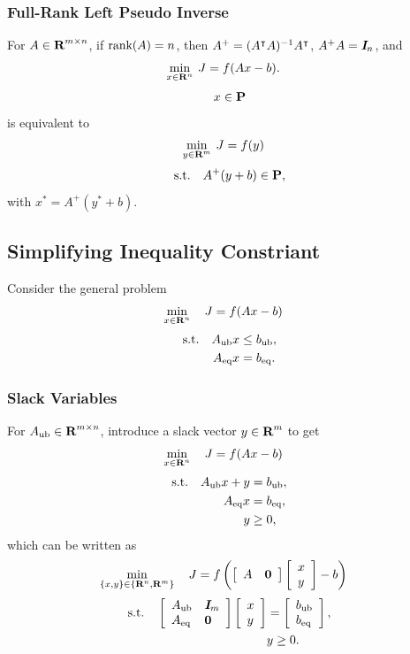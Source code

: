 \documentclass{article}
\begin{document}
\subsubsection{Full-Rank Left Pseudo Inverse}

    For $A\in\textbf{R}^{m\times n}$, if $\text{rank}(A)=n$, then
    $A^+ = (A^\intercal A)^{-1} A^\intercal$, $A^+A=\emph{\textbf{I}} _n$, and
    \begin{align*}
            \min_{x\in\textbf{R}^n}\:J
        &=
            f(A x - b).
    \end{align*}
    \begin{align*}
        x\in\textbf{P}
    \end{align*}
    is equivalent to
    \begin{align*}
        \min_{y\in\textbf{R}^m}\:J
    &= f(y)
    \end{align*}
    \begin{align*}
        \text{s.t.}\quad A^+(y+b)\in\textbf{P},
    \end{align*}
    with $x^*=A^+(y^*+b)$.

\clearpage

\subsection{Simplifying Inequality Constriant}

    Consider the general problem
    \begin{align*}
        \min_{x\in\textbf{R}^n}\quad J&=f(Ax-b)
    \end{align*}
    \begin{align*}
        \text{s.t.}\quad A_{\text{ub}} &x \leq b_{\text{ub}},\\
        A_{\text{eq}} &x = b_{\text{eq}}.
    \end{align*}

\subsubsection{Slack Variables}

    For $A_{\text{ub}}\in\textbf{R}^{m\times n}$, introduce a slack vector $y\in\textbf{R}^m$ to get
    \begin{align*}
        \min_{x\in\textbf{R}^n}\quad J&=f(Ax-b)
    \end{align*}
    \begin{align*}
        \text{s.t.}\quad A_{\text{ub}} x+y&= b_{\text{ub}},\\
        A_{\text{eq}} x &= b_{\text{eq}},\\
        y&\geq0,
    \end{align*}
    which can be written as
    \begin{align*}
        \min_{\{x,y\}\in\{\textbf{R}^n,\textbf{R}^m\}}\quad J&=f\left(\left[\begin{array}{lllllllllllllllllll}A & \textbf{0} \end{array}\right] \left[\begin{array}{lllllllllllllllllll}x \\ y\end{array}\right] -b\right)
    \end{align*}
    \begin{align*}
        \text{s.t.}\quad \left[\begin{array}{lllllllllllllllllll}A_{\text{ub}} & \emph{\textbf{I}}_m \\ A_{\text{eq}} & \textbf{0} \end{array}\right]\left[\begin{array}{lllllllllllllllllll}x\\y\end{array}\right] &= \left[\begin{array}{lllllllllllllllllll} b_{\text{ub}} \\ b_{\text{eq}}\end{array}\right],\\
        &y\geq 0.
    \end{align*}
\end{document}
